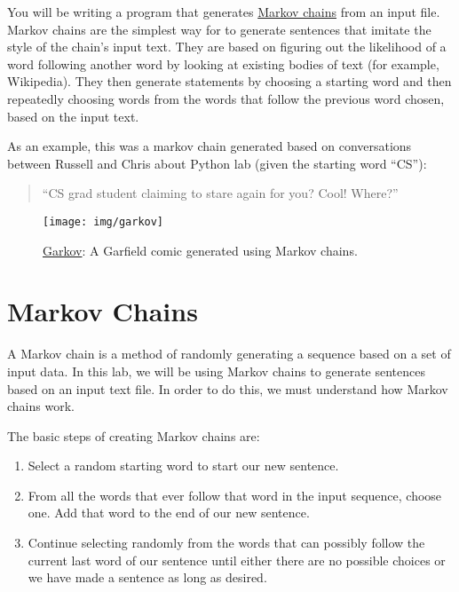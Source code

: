 \documentclass[11pt]{cselabheader}
\begin{document}
You will be writing a program that generates
\href{http://en.wikipedia.org/wiki/Markov_chain}{Markov chains} from an input
file. Markov chains are the simplest way for to generate sentences that
imitate the style of the chain's input text. They are based on figuring out the
likelihood of a word following another word by looking at existing bodies of
text (for example, Wikipedia). They then generate statements by choosing a
starting word and then repeatedly choosing words from the words that follow
the previous word chosen, based on the input text.

As an example, this was a markov chain generated based on conversations between
Russell and Chris about Python lab (given the starting word ``CS''):
\begin{quotation}
``CS grad student claiming to stare again for you? Cool! Where?''
\end{quotation}


\begin{figure}[!ht]
  \centering
  \texttt{[image: img/garkov]}
  \caption*{\href{http://joshmillard.com/garkov/}{Garkov}:
    A Garfield comic generated using Markov chains.}
  \label{garkov}
\end{figure}

\tableofcontents

\newpage
{}

\section{Markov Chains}
\label{sec:markov}

A Markov chain is a method of randomly generating a sequence based on a set of
input data. In this lab, we will be using Markov chains to generate sentences
based on an input text file. In order to do this, we must understand how Markov
chains work.

The basic steps of creating Markov chains are:
\begin{enumerate}
  \item Select a random starting word to start our new sentence.
  \item From all the words that ever follow that word in the input sequence,
    choose one. Add that word to the end of our new sentence.
  \item Continue selecting randomly from the words that can possibly follow the
    current last word of our sentence until either there are no possible
    choices or we have made a sentence as long as desired.
\end{enumerate}
\end{document}
